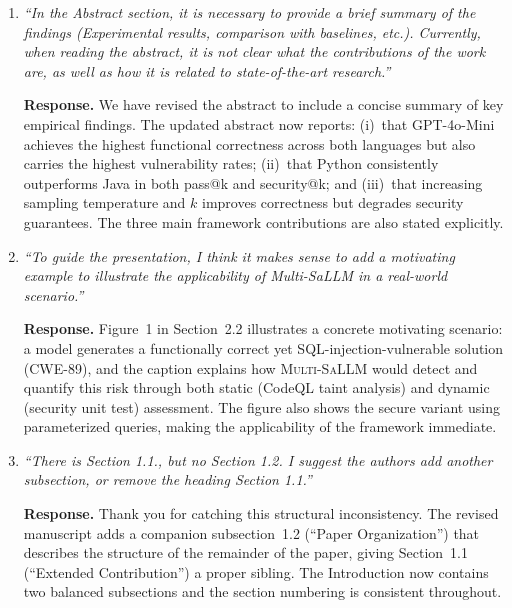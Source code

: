 \documentclass[12pt]{article}
\newcommand{\sandoval}{\textsc{Multi-SaLLM}}
\begin{document}
\begin{enumerate}[leftmargin=*, label=\textbf{R3.\arabic*.}]

\item \textit{``In the Abstract section, it is necessary to provide a brief summary of
the findings (Experimental results, comparison with baselines, etc.). Currently, when
reading the abstract, it is not clear what the contributions of the work are, as well
as how it is related to state-of-the-art research.''}

\textbf{Response.}
We have revised the abstract to include a concise summary of key empirical findings.
The updated abstract now reports: (i)~that GPT-4o-Mini achieves the highest
functional correctness across both languages but also carries the highest
vulnerability rates; (ii)~that Python consistently outperforms Java in both pass@k
and security@k; and (iii)~that increasing sampling temperature and $k$ improves
correctness but degrades security guarantees. The three main framework contributions
are also stated explicitly.

\item \textit{``To guide the presentation, I think it makes sense to add a motivating
example to illustrate the applicability of Multi-SaLLM in a real-world scenario.''}

\textbf{Response.}
Figure~1 in Section~2.2 illustrates a concrete motivating scenario: a model
generates a functionally correct yet SQL-injection-vulnerable solution (CWE-89),
and the caption explains how \sandoval{} would detect and quantify this risk
through both static (CodeQL taint analysis) and dynamic (security unit test)
assessment. The figure also shows the secure variant using parameterized queries,
making the applicability of the framework immediate.

\item \textit{``There is Section 1.1., but no Section 1.2. I suggest the authors add
another subsection, or remove the heading Section 1.1.''}

\textbf{Response.}
Thank you for catching this structural inconsistency. The revised manuscript adds
a companion subsection~1.2 (``Paper Organization'') that describes the structure of
the remainder of the paper, giving Section~1.1 (``Extended Contribution'') a proper
sibling. The Introduction now contains two balanced subsections and the section
numbering is consistent throughout.


\end{enumerate}
\end{document}
